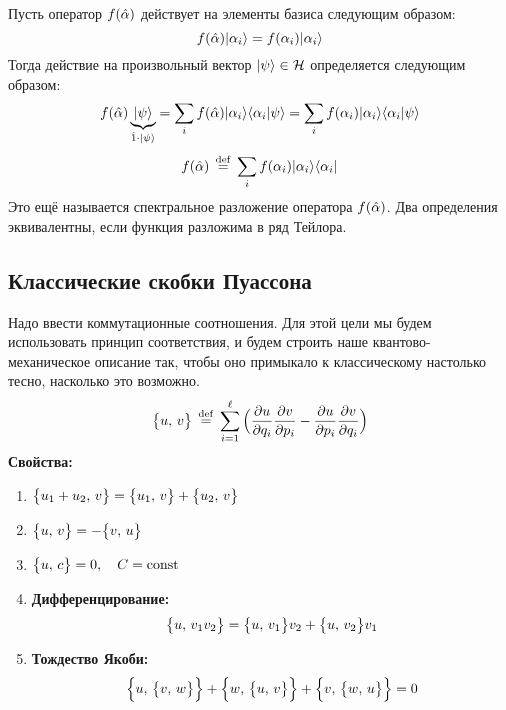 \Def  Пусть оператор $f(\Hat \alpha)$ действует на элементы базиса следующим образом:
$$
    f(\Hat \alpha) | \alpha_i \rangle = f(\alpha_i) | \alpha_i \rangle
$$
Тогда действие на произвольный вектор $| \psi \rangle \in \mathcal H$ определяется следующим образом:
$$
    f(\Hat \alpha) \underbrace{| \psi \rangle}_{\Hat 1 \cdot | \psi \rangle} =
    \sum_i f(\Hat \alpha) | \alpha_i \rangle \langle \alpha_i | \psi \rangle
    = \sum_i f(\alpha_i) | \alpha_i \rangle\langle \alpha_i | \psi \rangle
$$
$$
    f(\Hat \alpha) \,\overset{\mathrm{def}}{=}\, \sum_i f(\alpha_i) | \alpha_i \rangle \langle \alpha_i |
$$
Это ещё называется спектральное разложение оператора $f(\Hat \alpha)$. Два определения эквивалентны, если функция разложима в ряд Тейлора.
\subsection{Классические скобки Пуассона}

Надо ввести коммутационные соотношения. Для этой цели мы будем использовать принцип соответствия, и будем строить наше квантово-механическое описание так, чтобы оно примыкало к классическому настолько тесно, насколько это возможно.
$$
    { \big\{ u, \, v \big\} } \,\overset{\mathrm{def}}{=}\, \sum_{i=1}^\ell \Big( \dfrac{\partial u}{\partial q_i} \dfrac{\partial v}{\partial p_i} - \dfrac{\partial u}{\partial p_i} \dfrac{\partial v}{\partial q_i} \Big)
$$
\textbf{Свойства:}
\begin{enumerate}
  \item ${ \big\{ u_1 + u_2, \, v \big\} } = { \big\{ u_1, \, v \big\} } + { \big\{ u_2, \, v \big\} }$
  \item ${ \big\{ u, \, v \big\} } = - { \big\{ v, \, u \big\} }$
  \item ${ \big\{ u, \, c \big\} } = 0, \quad C = \mathrm{const}$
  \item \textbf{Дифференцирование:}
  $$
    { \big\{ u, \, v_1 v_2 \big\} } = { \big\{ u, \, v_1 \big\} }v_2 + { \big\{ u, \, v_2 \big\} }v_1
  $$
  \item \textbf{Тождество Якоби:}
  $$
    { \Big\{ u, \, { \big\{ v, \, w \big\} } \Big\} } + { \Big\{ w, \, { \big\{ u, \, v \big\} } \Big\} } + { \Big\{ v, \, { \big\{ w, \, u \big\} } \Big\} } = 0
  $$
\end{enumerate}
